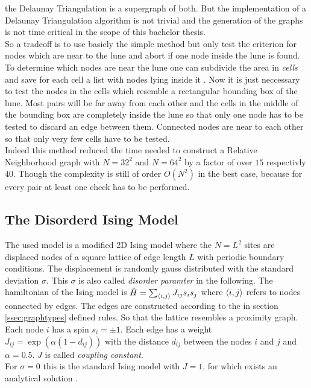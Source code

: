     the Delaunay Triangulation is a supergraph of both. But the
    implementation of a Delaunay Triangulation algorithm is not
    trivial and the generation of the graphs is not time critical in
    the scope of this bachelor thesis.\\
    So a tradeoff is to use basicly the simple method but only test
    the criterion for nodes which are near to the lune and abort if
    one node inside the lune is found. To determine which nodes are
    near the lune one can subdivide the area in \emph{cells} and save
    for each cell a list with nodes lying inside it \cite{RNGCell}.
    Now it is just neccessary to test the nodes in the cells which
    resemble a rectangular bounding box of the lune. Most pairs will be
    far away from each other and the cells in the middle of the bounding
    box are completely inside the lune so that only one node has to be
    tested to discard an edge between them. Connected nodes are near to
    each other so that only very few cells have to be tested.\\
    Indeed this method reduced the time needed to construct a Relative
    Neighborhood graph with \(N=32^2\) and \(N=64^2\) by a factor of
    over \(15\) respectivly \(40\). Though the complexity is still of
    order \(O(N^2)\) in the best case, because for every pair at least
    one check has to be performed.

\subsection{The Disorderd Ising Model}
\label{ssec:isingmodel}
    The used model is a modified 2D Ising model where the \(N=L^2\) sites
    are displaced nodes of a square lattice of edge length \(L\) with
    periodic boundary conditions. The displacement is randomly gauss
    distributed with the standard deviation \(\sigma\). This \(\sigma\)
    is also called \emph{disorder paramter} in the following.
    The hamiltonian of the Ising model is
    \(\hat{H} = \sum_{\left< i,j \right>}J_{ij}s_{i}s_{j}\)
    where \(\left< i,j \right>\) refers to nodes connected  by edges.
    The edges are constructed according to the in section
    \ref{ssec:graphtypes} defined rules. So that the lattice resembles a
    proximity graph. Each node \(i\) has a spin \(s_i = \pm 1\). Each
    edge has a weight \(J_{ij} = \exp (\alpha (1-d_{ij}))\) with the
    distance \(d_{ij}\) between the nodes \(i\) and \(j\) and
    \(\alpha = 0.5\). \(J\) is called \emph{coupling constant}.\\
    For \(\sigma = 0\) this is the standard Ising model with \(J = 1\),
    for which exists an analytical solution \cite{Onsager1944}.\\

